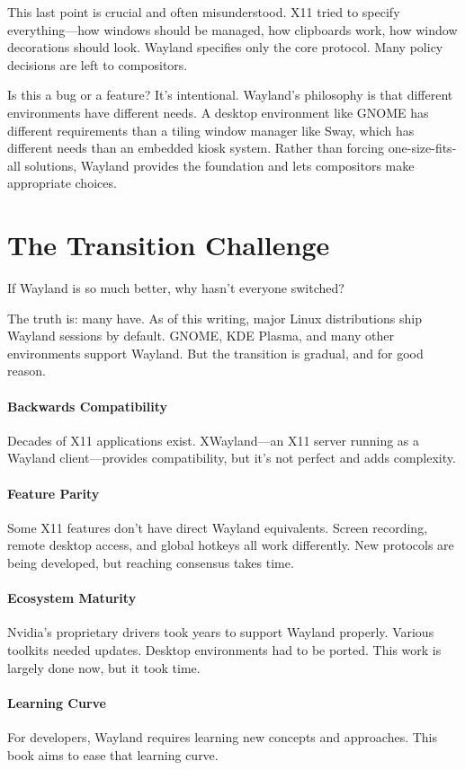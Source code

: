 This last point is crucial and often misunderstood. X11 tried to specify everything—how windows should be managed, how clipboards work, how window decorations should look. Wayland specifies only the core protocol. Many policy decisions are left to compositors.

Is this a bug or a feature? It's intentional. Wayland's philosophy is that different environments have different needs. A desktop environment like GNOME has different requirements than a tiling window manager like Sway, which has different needs than an embedded kiosk system. Rather than forcing one-size-fits-all solutions, Wayland provides the foundation and lets compositors make appropriate choices.

\section*{The Transition Challenge}

If Wayland is so much better, why hasn't everyone switched?

The truth is: many have. As of this writing, major Linux distributions ship Wayland sessions by default. GNOME, KDE Plasma, and many other environments support Wayland. But the transition is gradual, and for good reason.

\paragraph{Backwards Compatibility} Decades of X11 applications exist. XWayland—an X11 server running as a Wayland client—provides compatibility, but it's not perfect and adds complexity.

\paragraph{Feature Parity} Some X11 features don't have direct Wayland equivalents. Screen recording, remote desktop access, and global hotkeys all work differently. New protocols are being developed, but reaching consensus takes time.

\paragraph{Ecosystem Maturity} Nvidia's proprietary drivers took years to support Wayland properly. Various toolkits needed updates. Desktop environments had to be ported. This work is largely done now, but it took time.

\paragraph{Learning Curve} For developers, Wayland requires learning new concepts and approaches. This book aims to ease that learning curve.

